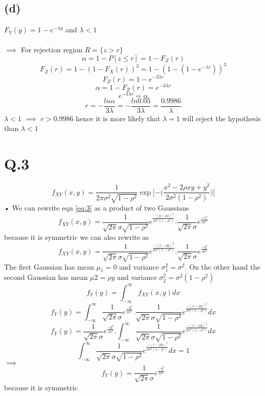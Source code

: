\documentclass[a4paper,11pt]{article}
\begin{document}
\subsection*{(d)}
$F_Y(y) = 1 - e^{-\lambda y}$ and $\lambda <1$\\\\
$\implies $ For rejection region $R = \{z>r\}$\\
$$\alpha = 1- P[z\leq r] = 1-F_Z(r)$$
$$F_Z(r) = 1-(1-F_X(r))^3=1-(1-(1-e^{-\lambda r}))^3$$
$$F_Z(r) =1-e^{-3\lambda r}$$
$$\alpha = 1- F_Z(r)=e^{-3\lambda r}$$
$$e^{-3\lambda r}=\alpha $$
$$r =-\frac{ln\alpha}{3\lambda}=-\frac{ln 0.05}{3\lambda}=\frac{0.9986}{\lambda}$$
$\lambda<1$ $\implies$ $r>0.9986$ hence it is more likely that $\lambda = 1$ will reject the hypothesis than $\lambda<1$
\newpage
\clearpage
\section*{Q.3}
\begin{equation}\label{eq:3}
f_{XY}(x,y) = \frac{1}{2\pi\sigma^2\sqrt{1-\rho^2}}\exp\bigg[{-\bigg(\frac{x^2-2\rho xy + y^2}{2\sigma^2(1-\rho^2)}       \bigg)}\bigg]
\end{equation}•
We can rewrite eqn \ref{eq:3} as a product of two Gaussians\\
$$f_{XY}(x,y) = \frac{1}{ \sqrt{2\pi}\sigma\sqrt{1-\rho^2}}e^{\frac{-(y-\rho x)^2}{2\sigma^2(1-\rho^2)}}.
\frac{1}{ \sqrt{2\pi}\sigma}e^{\frac{-x^2}{2\sigma^2}}
$$
because it is symmetric we can also rewrite as 
$$f_{XY}(x,y) = \frac{1}{ \sqrt{2\pi}\sigma\sqrt{1-\rho^2}}e^{\frac{-(x-\rho y)^2}{2\sigma^2(1-\rho^2)}}.
\frac{1}{ \sqrt{2\pi}\sigma}e^{\frac{-y^2}{2\sigma^2}}
$$
The first Gaussian has mean $\mu_1 = 0$ and variance $\sigma_1^2=\sigma^2$. On the other hand the second Gaussian has mean  $\mu2 = \rho y$ and variance $\sigma_2^2=\sigma^2(1-\rho^2)$ 
$$f_Y(y) = \int_{-\infty}^{\infty}f_{XY}(x,y)dx$$
$$f_Y(y) = \int_{-\infty}^{\infty}\frac{1}{ \sqrt{2\pi}\sigma}e^{\frac{-y^2}{2\sigma^2}}.\frac{1}{ \sqrt{2\pi}\sigma\sqrt{1-\rho^2}}e^{\frac{-(x-\rho y)^2}{2\sigma^2(1-\rho^2)}}dx$$
$$f_Y(y) =\frac{1}{ \sqrt{2\pi}\sigma}e^{\frac{-y^2}{2\sigma^2}}.\int_{-\infty}^{\infty}\frac{1}{ \sqrt{2\pi}\sigma\sqrt{1-\rho^2}}e^{\frac{-(x-\rho y)^2}{2\sigma^2(1-\rho^2)}}dx$$
$$\int_{-\infty}^{\infty}\frac{1}{ \sqrt{2\pi}\sigma\sqrt{1-\rho^2}}e^{\frac{-(x-\rho y)^2}{2\sigma^2(1-\rho^2)}}dx=1$$
$\implies$
$$f_Y(y) =\frac{1}{ \sqrt{2\pi}\sigma}e^{\frac{-y^2}{2\sigma^2}}$$
because it is symmetric\\\\
\end{document}
